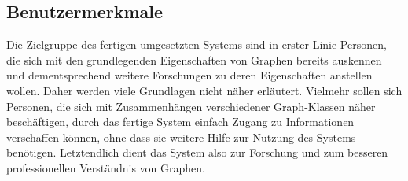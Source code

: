 \documentclass[11pt,a4paper]{article}
\begin{document}
\begin{enumerate}[leftmargin=.9cm]
\end{enumerate}
     
    \subsection{Benutzermerkmale} %
	Die Zielgruppe des fertigen umgesetzten Systems sind in erster Linie Personen, die sich mit den grundlegenden Eigenschaften von Graphen bereits auskennen und dementsprechend weitere Forschungen zu deren Eigenschaften anstellen wollen. Daher werden viele Grundlagen nicht näher erläutert. Vielmehr sollen sich Personen, die sich mit Zusammenhängen verschiedener Graph-Klassen näher beschäftigen, durch das fertige System einfach Zugang zu Informationen verschaffen können, ohne dass sie weitere Hilfe zur Nutzung des Systems benötigen.
	Letztendlich dient das System also zur Forschung und zum besseren professionellen Verständnis von Graphen.
\end{document}
